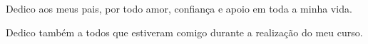 
\begin{dedicatoria}
Dedico aos meus pais, por todo amor, confiança e apoio em toda a minha vida.

Dedico também a todos que estiveram comigo durante a realização do meu curso.
\end{dedicatoria}
